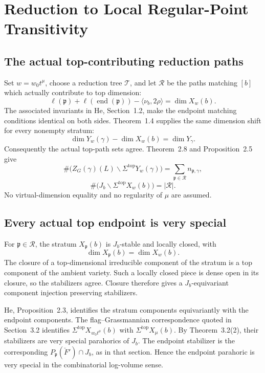 \documentclass[11pt,a4paper]{article}
\theoremstyle{definition}
\theoremstyle{remark}
\begin{document}
\section{Reduction to Local Regular-Point Transitivity}\label{sec:reduction}

\subsection{The actual top-contributing reduction paths}
Set \(w=w_0t^\mu\), choose a reduction tree \(\mathcal T\), and let
\(\mathcal R\) be the paths matching \([b]\) which actually contribute
to top dimension:
\[
\ell(\mathfrak p)+\ell(\operatorname{end}(\mathfrak p))
-\langle\nu_b,2\rho\rangle=\dim X_w(b).
\]
The associated invariants in He, Section~1.2, make the endpoint
matching conditions identical on both sides. Theorem~1.4 supplies
the same dimension shift for every nonempty stratum:
\[
\dim Y_w(\gamma)-\dim X_w(b)=\dim Y_\gamma.
\]
Consequently the actual top-path sets agree. Theorem~2.8 and
Proposition~2.5 give
\[
\#\bigl(Z_G(\gamma)(L)\backslash
\Sigma^{\mathrm{top}}Y_w(\gamma)\bigr)
=\sum_{\mathfrak p\in\mathcal R}n_{\mathfrak p,\gamma},
\]
\[
\#\bigl(J_b\backslash\Sigma^{\mathrm{top}}X_w(b)\bigr)
=|\mathcal R|.
\]
No virtual-dimension equality and no regularity of \(\mu\) are assumed.

\subsection{Every actual top endpoint is very special}
For \(\mathfrak p\in\mathcal R\), the stratum \(X_{\mathfrak p}(b)\)
is \(J_b\)-stable and locally closed, with
\[
\dim X_{\mathfrak p}(b)=\dim X_w(b).
\]
The closure of a top-dimensional irreducible component of the stratum
is a top component of the ambient variety. Such a locally closed
piece is dense open in its closure, so the stabilizers agree.
Closure therefore gives a \(J_b\)-equivariant component injection
preserving stabilizers.

He, Proposition~2.3, identifies the stratum components equivariantly
with the endpoint components. The flag--Grassmannian correspondence
quoted in Section~3.2 identifies
\(\Sigma^{\mathrm{top}}X_{w_0t^\mu}(b)\) with
\(\Sigma^{\mathrm{top}}X_\mu(b)\). By Theorem~3.2(2), their stabilizers
are very special parahorics of \(J_b\). The endpoint stabilizer is
the corresponding \(P_{\mathfrak p}(\breve F')\cap J_b\), as in that
section. Hence the endpoint parahoric is very special in the
combinatorial log-volume sense.
\end{document}
